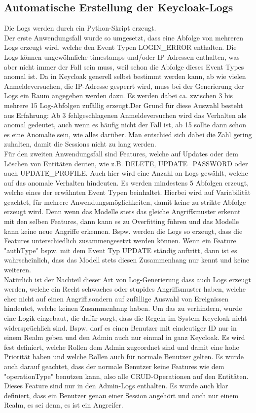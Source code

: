 \documentclass[a4paper,12pt]{article}
\begin{document}
	\subsection{Automatische Erstellung der Keycloak-Logs}
	Die Logs werden durch ein Python-Skript erzeugt.
		\\[0.5em]
	Der erste Anwendungsfall wurde so umgesetzt, dass eine Abfolge von mehreren Logs erzeugt wird, welche den Event Typen LOGIN\_ERROR enthalten. Die Logs können ungewöhnliche timestamps und/oder IP-Adressen enthalten, was aber nicht immer der Fall sein muss, weil schon die Abfolge dieses Event Types anomal ist. Da in Keycloak generell selbst bestimmt werden kann, ab wie vielen Anmeldeversuchen, die IP-Adresse gesperrt wird, muss bei der Generierung der Logs ein Raum angegeben werden dazu. Es werden dabei ca. zwischen 3 bis mehrere 15 Log-Abfolgen zufällig erzeugt.Der Grund für diese Auswahl besteht aus Erfahrung: Ab 3 fehlgeschlagenen Anmeldeversuchen wird das Verhalten als anomal gedeutet, auch wenn es häufig nicht der Fall ist, ab 15 sollte dann schon es eine Anomalie sein, wie alles darüber. Man entschied sich dabei die Zahl gering zuhalten, damit die Sessions nicht zu lang werden.
	\\[0.5em]
	Für den zweiten Anwendungsfall sind Features, welche auf Updates oder dem Löschen von Entitäten deuten, wie z.B. DELETE, UPDATE\_PASSWORD oder auch UPDATE\_PROFILE. Auch hier wird eine Anzahl an Logs gewählt, welche auf das anomale Verhalten hindeuten. Es werden mindestens 5 Abfolgen erzeugt, welche eines der erwähnten Event Typen beinhaltet. Hierbei wird auf Variabilität geachtet, für mehrere Anwendungsmöglichkeiten, damit keine zu strikte Abfolge erzeugt wird. Denn wenn das Modelle stets das gleiche Angriffsmuster erkennt mit den selben Features, dann kann es zu Overfitting führen und das Modelle kann keine neue Angriffe erkennen. Bspw. werden die Logs so erzeugt, dass die Features unterschiedlich zusammengesetzt werden können. Wenn ein Feature "authType" bspw. mit dem Event Typ UPDATE ständig auftritt, dann ist es wahrscheinlich, dass das Modell stets diesen Zusammenhang nur kennt und keine weiteren.
	\\[0.5em]
	Natürlich ist der Nachteil dieser Art von Log-Generierung dass auch Logs erzeugt werden, welche ein Recht schwaches oder stupides Angriffsmuster haben, welche eher nicht auf einen Angriff,sondern auf zufällige Auswahl von Ereignissen hindeutet, welche keinen Zusammenhang haben. Um das zu verhindern, wurde eine Logik eingebaut, die dafür sorgt, dass die Regeln im System Keycloak nicht widersprüchlich sind. Bspw. darf es einen Benutzer mit eindeutiger ID nur in einem Realm geben und den Admin auch nur einmal in ganz Keycloak. Es wird fest definiert, welche Rollen dem Admin zugeordnet sind und damit eine hohe Priorität haben und welche Rollen auch für normale Benutzer gelten. Es wurde auch darauf geachtet, dass der normale Benutzer keine Features wie dem "operationType" benutzen kann, also alle CRUD-Operationen auf den Entitäten. Dieses Feature sind nur in den Admin-Logs enthalten. Es wurde auch klar definiert, dass ein Benutzer genau einer Session angehört und auch nur einem Realm, es sei denn, es ist ein Angreifer.
\end{document}
